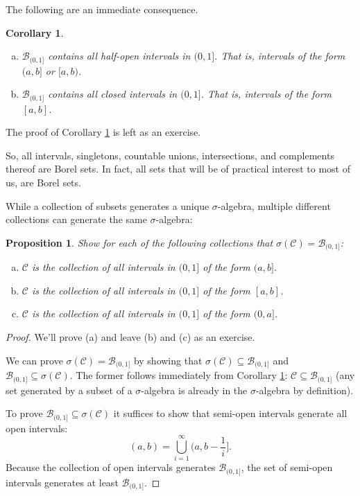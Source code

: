 \documentclass{book}
\theoremstyle{plain}%
\newtheorem{corollary}{Corollary}[section]
\newtheorem{proposition}{Proposition}[section]
\theoremstyle{definition}
\begin{document}
The following are an immediate consequence.

\begin{corollary}
\text{ }
\begin{enumerate}[(a)]
\item $\mathcal{B}_{(0,1]}$ contains all half-open intervals in $(0,1]$. That is, intervals of the form $(a,b]$ or $[a,b)$.
\item $\mathcal{B}_{(0,1]}$ contains all closed intervals in $(0,1]$. That is, intervals of the form $[a,b]$.
\end{enumerate}
\label{prop:borel_sets}
\end{corollary}

The proof of Corollary \ref{prop:borel_sets} is left as an exercise.

So, all intervals, singletons, countable unions, intersections, and complements thereof are Borel sets. In fact, all sets that will be of practical interest to most of us, are Borel sets.

While a collection of subsets generates a unique $\sigma$-algebra, multiple different collections can generate the same $\sigma$-algebra:


\begin{proposition}
Show for each of the following collections that $\sigma(\mathcal{C}) = \mathcal{B}_{(0,1]}$:
\begin{enumerate}[(a)]
\item $\mathcal{C}$ is the collection of all intervals in $(0,1]$ of the form $(a,b]$.
\item $\mathcal{C}$ is the collection of all intervals in $(0,1]$ of the form $[a,b]$.
\item $\mathcal{C}$ is the collection of all intervals in $(0,1]$ of the form $(0,a]$.
\end{enumerate}\label{prop:generateborel}
\end{proposition}

\begin{proof}
We'll prove (a) and leave (b) and (c) as an exercise.

We can prove $\sigma(\mathcal{C}) = \mathcal{B}_{(0,1]}$ by showing that $\sigma(\mathcal{C}) \subseteq \mathcal{B}_{(0,1]}$ and $\mathcal{B}_{(0,1]} \subseteq \sigma(\mathcal{C})$. The former follows immediately from Corollary \ref{prop:borel_sets}: $\mathcal{C} \subseteq \mathcal{B}_{(0,1]}$ (any set generated by a subset of a $\sigma$-algebra is already in the $\sigma$-algebra by definition).

To prove $\mathcal{B}_{(0,1]} \subseteq \sigma(\mathcal{C})$ it suffices to show that semi-open intervals generate all open intervals:
$$(a,b) = \displaystyle\bigcup_{i=1}^\infty (a,b-\frac{1}{i}].$$
Because the collection of open intervals generates $\mathcal{B}_{(0,1]}$, the set of semi-open intervals generates at least $\mathcal{B}_{(0,1]}$. 
\end{proof}
\end{document}
